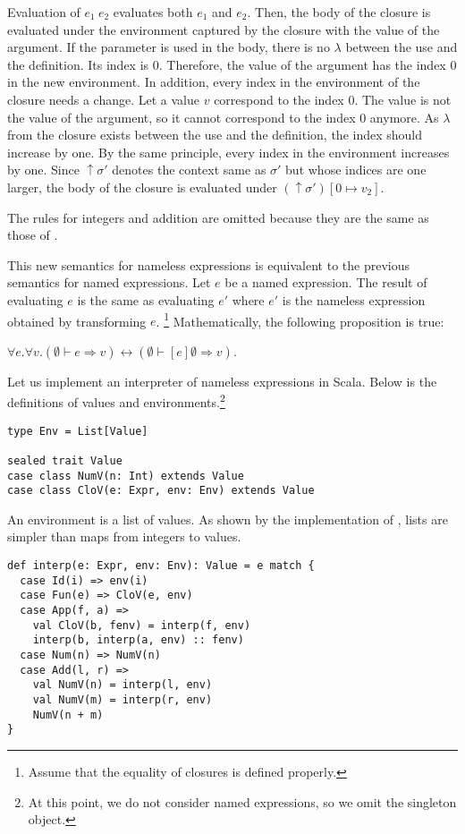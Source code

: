 Evaluation of $e_1\ e_2$ evaluates both $e_1$ and $e_2$. Then, the body of the
closure is evaluated under the environment captured by the closure with the value
of the argument. If the parameter is used in the body, there is no $\lambda$
between the use and the definition. Its index is 0. Therefore, the value of the
argument has the index 0 in the new environment. In addition, every index in the
environment of the closure needs a change. Let a value $v$ correspond to the
index 0. The value is not the value of the argument, so it cannot correspond to
the index 0 anymore. As $\lambda$ from the closure exists between the use and the
definition, the index should increase by one. By the same principle, every index
in the environment increases by one. Since $\uparrow\sigma'$ denotes the context
same as $\sigma'$ but whose indices are one larger, the body of the closure
is evaluated under $(\uparrow\sigma')[0\mapsto v_2]$.

The rules for integers and addition are omitted because they are the same as those
of \Lang.

This new semantics for nameless expressions is equivalent to the previous
semantics for named expressions.
Let $e$ be a named expression. The result of evaluating $e$ is the same as
evaluating $e'$ where $e'$ is the nameless expression obtained by transforming $e$.
\footnote{Assume that the equality of closures is defined properly.}
Mathematically, the following proposition is true:

$\forall e.\forall v.(\emptyset\vdash e\Rightarrow
v)\leftrightarrow(\emptyset\vdash[e]\emptyset\Rightarrow v)$.

Let us implement an interpreter of nameless expressions in Scala.
Below is the definitions of values and environments.\footnote{At this point, we
do not consider named expressions, so we omit the  singleton
object.}

\begin{verbatim}
type Env = List[Value]

sealed trait Value
case class NumV(n: Int) extends Value
case class CloV(e: Expr, env: Env) extends Value
\end{verbatim}

An environment is a list of values. As shown by the implementation of
, lists are simpler than maps from integers to values.

\begin{verbatim}
def interp(e: Expr, env: Env): Value = e match {
  case Id(i) => env(i)
  case Fun(e) => CloV(e, env)
  case App(f, a) =>
    val CloV(b, fenv) = interp(f, env)
    interp(b, interp(a, env) :: fenv)
  case Num(n) => NumV(n)
  case Add(l, r) =>
    val NumV(n) = interp(l, env)
    val NumV(m) = interp(r, env)
    NumV(n + m)
}
\end{verbatim}

